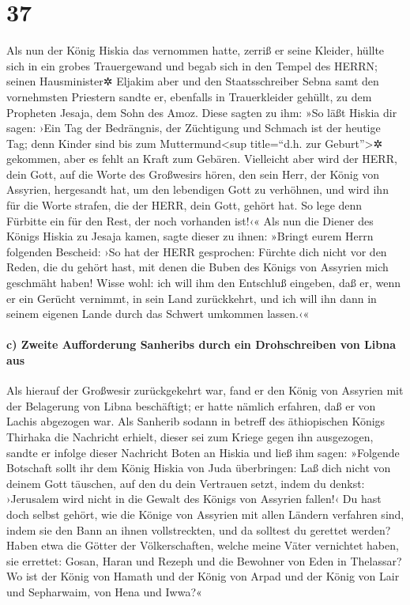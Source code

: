 \hypertarget{section-36}{%
\section{37}\label{section-36}}

Als nun der König Hiskia das vernommen hatte, zerriß er
seine Kleider, hüllte sich in ein grobes Trauergewand und begab sich in
den Tempel des HERRN; seinen Hausminister✲ Eljakim aber
und den Staatsschreiber Sebna samt den vornehmsten Priestern sandte er,
ebenfalls in Trauerkleider gehüllt, zu dem Propheten Jesaja, dem Sohn
des Amoz. Diese sagten zu ihm: »So läßt Hiskia dir sagen:
›Ein Tag der Bedrängnis, der Züchtigung und Schmach ist der heutige Tag;
denn Kinder sind bis zum Muttermund\textless sup title=``d.h. zur
Geburt''\textgreater✲ gekommen, aber es fehlt an Kraft zum Gebären.
Vielleicht aber wird der HERR, dein Gott, auf die Worte
des Großwesirs hören, den sein Herr, der König von Assyrien, hergesandt
hat, um den lebendigen Gott zu verhöhnen, und wird ihn für die Worte
strafen, die der HERR, dein Gott, gehört hat. So lege denn Fürbitte ein
für den Rest, der noch vorhanden ist!‹« Als nun die Diener
des Königs Hiskia zu Jesaja kamen, sagte dieser zu ihnen:
»Bringt eurem Herrn folgenden Bescheid: ›So hat der HERR gesprochen:
Fürchte dich nicht vor den Reden, die du gehört hast, mit denen die
Buben des Königs von Assyrien mich geschmäht haben! Wisse
wohl: ich will ihm den Entschluß eingeben, daß er, wenn er ein Gerücht
vernimmt, in sein Land zurückkehrt, und ich will ihn dann in seinem
eigenen Lande durch das Schwert umkommen lassen.‹«

\hypertarget{c-zweite-aufforderung-sanheribs-durch-ein-drohschreiben-von-libna-aus}{%
\paragraph{c) Zweite Aufforderung Sanheribs durch ein Drohschreiben von
Libna
aus}\label{c-zweite-aufforderung-sanheribs-durch-ein-drohschreiben-von-libna-aus}}

Als hierauf der Großwesir zurückgekehrt war, fand er den
König von Assyrien mit der Belagerung von Libna beschäftigt; er hatte
nämlich erfahren, daß er von Lachis abgezogen war. Als
Sanherib sodann in betreff des äthiopischen Königs Thirhaka die
Nachricht erhielt, dieser sei zum Kriege gegen ihn ausgezogen, sandte er
infolge dieser Nachricht Boten an Hiskia und ließ ihm sagen:
»Folgende Botschaft sollt ihr dem König Hiskia von Juda
überbringen: Laß dich nicht von deinem Gott täuschen, auf den du dein
Vertrauen setzt, indem du denkst: ›Jerusalem wird nicht in die Gewalt
des Königs von Assyrien fallen!‹ Du hast doch selbst
gehört, wie die Könige von Assyrien mit allen Ländern verfahren sind,
indem sie den Bann an ihnen vollstreckten, und da solltest du gerettet
werden? Haben etwa die Götter der Völkerschaften, welche
meine Väter vernichtet haben, sie errettet: Gosan, Haran und Rezeph und
die Bewohner von Eden in Thelassar? Wo ist der König von
Hamath und der König von Arpad und der König von Lair und Sepharwaim,
von Hena und Iwwa?«

